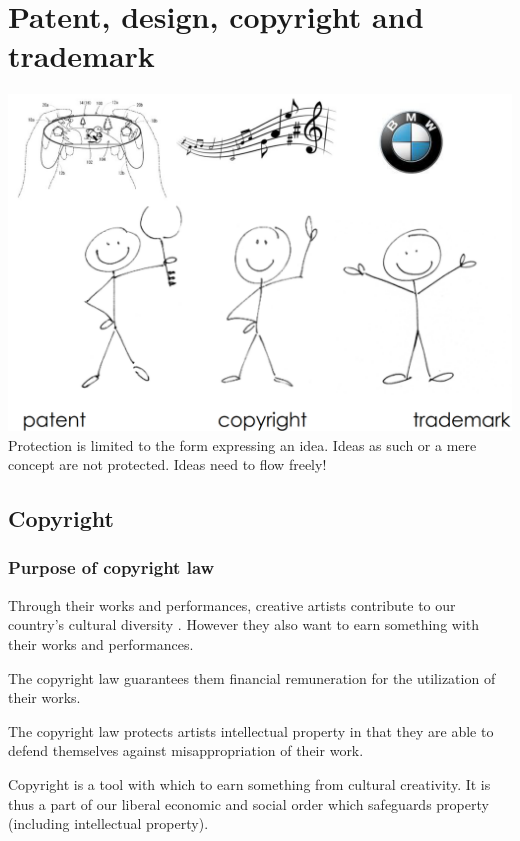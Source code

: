 \section{Patent, design, copyright and trademark}
\includegraphics[width=1\linewidth]{images/patent_copyright_and_trademark}
Protection is limited to the form expressing an idea. Ideas as such or a mere concept are not protected. Ideas need to flow freely!

\subsection{Copyright}
\subsubsection{Purpose of copyright law}
Through their works and performances, creative artists contribute to our country's cultural diversity . However they also want to earn something with their works and performances.
\begin{compactitem}
	\item The copyright law guarantees them financial remuneration for the utilization of their works. 
	\item The copyright law protects artists intellectual property in that they are able to defend themselves against misappropriation of their work.
	\item Copyright is a tool with which to earn something from cultural creativity. It is thus a part of our liberal economic and social order which safeguards property (including intellectual property). 
\end{compactitem}

